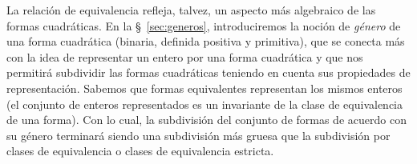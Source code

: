 \theoremstyle{plain}
\newtheorem{teoGeneros}{\teoname}[section]
\newtheorem{coroGeneros}[teoGeneros]{\coroname}
\newtheorem{lemaGeneros}[teoGeneros]{\lemaname}

\theoremstyle{definition}
\newtheorem{defGeneros}[teoGeneros]{}
\newtheorem{ejemGeneros}[teoGeneros]{\ejemname}
\newtheorem{obsGeneros}[teoGeneros]{\obsname}


La relaci\'on de equivalencia refleja, talvez, un aspecto m\'as
algebraico de las formas cuadr\'aticas.
En la \S~\ref{sec:generos}, introduciremos la noci\'on de \emph{g\'enero}
de una forma cuadr\'atica (binaria, definida positiva y primitiva),
que se conecta m\'as con la idea de representar un entero por una forma
cuadr\'atica y que nos permitir\'a subdividir las formas cuadr\'aticas
teniendo en cuenta sus propiedades de representaci\'on.
Sabemos que formas equivalentes representan los mismos enteros
(el conjunto de enteros representados es un invariante de la
clase de equivalencia de una forma).
Con lo cual, la subdivisi\'on del conjunto de formas de acuerdo con su
g\'enero terminar\'a siendo una subdivisi\'on m\'as gruesa que la
subdivisi\'on por clases de equivalencia o clases de equivalencia
estricta.

